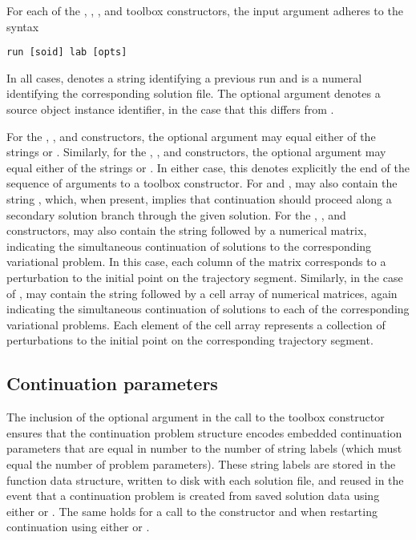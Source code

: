 For each of the , , , and  toolbox constructors, the  input argument adheres to the syntax
\begin{lstlisting}[language=coco-highlight]
run [soid] lab [opts]
\end{lstlisting}
In all cases,  denotes a string identifying a previous run and  is a numeral identifying the corresponding solution file. The optional argument  denotes a source object instance identifier, in the case that this differs from .

For the , , and  constructors, the optional  argument may equal either of the strings  or . Similarly, for the , , and  constructors, the optional  argument may equal either of the strings  or . In either case, this denotes explicitly the end of the sequence of arguments to a  toolbox constructor. For  and ,  may also contain the string , which, when present, implies that continuation should proceed along a secondary solution branch through the given solution. For the , , and  constructors,  may also contain the string  followed by a numerical matrix, indicating the simultaneous continuation of solutions to the corresponding variational problem. In this case, each column of the matrix corresponds to a perturbation to the initial point on the trajectory segment. Similarly, in the case of ,  may contain the string  followed by a cell array of numerical matrices, again indicating the simultaneous continuation of solutions to each of the corresponding variational problems. Each element of the cell array represents a collection of perturbations to the initial point on the corresponding trajectory segment.

\subsection{Continuation parameters}

The inclusion of the  optional argument in the call to the  toolbox constructor ensures that the continuation problem structure encodes embedded continuation parameters that are equal in number to the number of string labels (which must equal the number of problem parameters). These string labels are stored in the function data structure, written to disk with each solution file, and reused in the event that a continuation problem is created from saved solution data using either  or . The same holds for a call to the  constructor and when restarting continuation using either  or .

